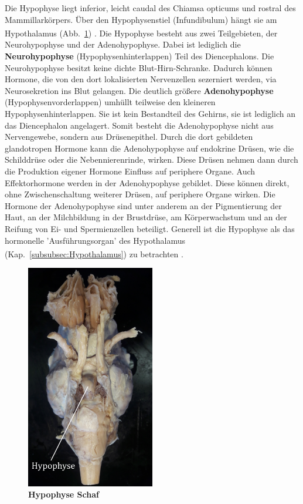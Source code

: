\documentclass[12pt,a4paper,pdftex]{article}
\begin{document}
Die Hypophyse liegt inferior, leicht caudal des Chiamsa opticums und rostral des Mammillarkörpers. Über den Hypophysenstiel (Infundibulum) hängt sie am Hypothalamus (Abb.~\ref{fig:hypophyse}) \textsuperscript{\cite[4]{trepel2011neuroanatomie}}. Die Hypophyse besteht aus zwei Teilgebieten, der Neurohypophyse und der Adenohypophyse. Dabei ist lediglich die \textbf{Neurohypophyse} (Hypophysenhinterlappen) Teil des Diencephalons. Die Neurohypophyse besitzt keine dichte Blut-Hirn-Schranke. Dadurch können Hormone, die von den dort lokalisierten Nervenzellen sezerniert werden, via Neurosekretion ins Blut gelangen. Die deutlich größere \textbf{Adenohypophyse} (Hypophysenvorderlappen) umhüllt teilweise den kleineren Hypophysenhinterlappen. Sie ist kein Bestandteil des Gehirns, sie ist lediglich an das Diencephalon angelagert. Somit besteht die Adenohypophyse nicht aus Nervengewebe, sondern aus Drüsenepithel. Durch die dort gebildeten glandotropen Hormone kann die Adenohypophyse auf endokrine Drüsen, wie die Schilddrüse oder die Nebennierenrinde, wirken. Diese Drüsen nehmen dann durch die Produktion eigener Hormone  Einfluss auf periphere Organe. Auch Effektorhormone werden in der Adenohypophyse gebildet. Diese können direkt, ohne Zwischenschaltung weiterer Drüsen, auf periphere Organe wirken. Die Hormone der Adenohypophyse sind unter anderem an der Pigmentierung der Haut, an der Milchbildung in der Brustdrüse, am Körperwachstum und an der Reifung von Ei- und Spermienzellen beteiligt. Generell ist die Hypophyse als das hormonelle 'Ausführungsorgan' des Hypothalamus (Kap.~\ref{subsubsec:Hypothalamus}) zu betrachten  \textsuperscript{\cite[8]{trepel2011neuroanatomie}}.

\begin{figure}[H]
    \centering
    \includegraphics[width=0.5\textwidth]{pictures/Bilder_Jule/Schaf/Aussenansicht/Hypophyse.png}
    \caption[Hypophyse Schaf]{\textbf{Hypophyse Schaf}}
    \label{fig:hypophyse}
\end{figure}
\end{document}

